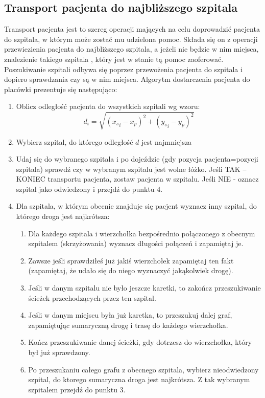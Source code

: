 \documentclass[10pt,a4paper]{article}
\begin{document}
\subsection{Transport pacjenta do najbliższego szpitala}

Transport pacjenta jest to szereg operacji mających na celu doprowadzić pacjenta do szpitala, w którym może zostać mu udzielona pomoc.
Składa się on z operacji przewiezienia pacjenta do najbliższego szpitala, a jeżeli nie będzie w nim miejsca, znalezienie takiego szpitala , który jest w stanie tą pomoc zaoferować.
Poszukiwanie szpitali odbywa się poprzez przewożenia pacjenta do szpitala i dopiero sprawdzania czy są w nim miejsca.
Algorytm dostarczenia pacjenta do placówki prezentuje się następująco:

\begin{enumerate}
    \item Oblicz odległość pacjenta do wszystkich szpitali wg wzoru:
    $$d_i=\sqrt{({x_s}_i-x_p)^2+({y_s}_i-y_p)^2}$$
    \item Wybierz szpital, do którego odległość $d$ jest najmniejsza
    \item Udaj się do wybranego szpitala i po dojeździe (gdy pozycja pacjenta=pozycji szpitala) sprawdź czy w wybranym szpitalu jest wolne łóżko. Jeśli TAK – KONIEC transportu pacjenta, zostaw pacjenta w szpitalu. Jeśli NIE - oznacz szpital jako odwiedzony i przejdź do punktu 4.
    \item Dla szpitala, w którym obecnie znajduje się pacjent wyznacz inny szpital, do którego droga jest najkrótsza:
    \begin{enumerate}[4.1.]
        \item Dla każdego szpitala i wierzchołka bezpośrednio połączonego z obecnym szpitalem (skrzyżowania) wyznacz długości połączeń i zapamiętaj je.
        \item Zawsze jeśli sprawdziłeś już jakiś wierzchołek zapamiętaj ten fakt (zapamiętaj, że udało się do niego wyznaczyć jakąkolwiek drogę).
        \item Jeśli w danym szpitalu nie było jeszcze karetki, to zakończ przeszukiwanie ścieżek przechodzących przez ten szpital.
        \item Jeśli w danym miejscu była już karetka, to przeszukuj dalej graf, zapamiętując sumaryczną drogę i trasę do każdego wierzchołka.
        \item Kończ przeszukiwanie danej ścieżki, gdy dotrzesz do wierzchołka, który był już sprawdzony.
        \item Po przeszukaniu całego grafu z obecnego szpitala, wybierz nieodwiedzony szpital, do ktorego sumaryczna droga jest najkrótsza. Z tak wybranym szpitalem przejdź do punktu 3. 
    \end{enumerate}
\end{enumerate}
\end{document}
